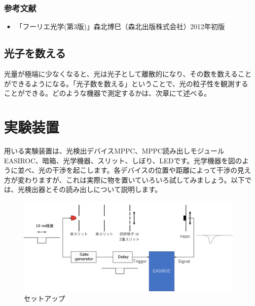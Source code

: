 \documentclass[10pt]{ujarticle}
\begin{document}
\subsubsection{参考文献}
\begin{itemize}
\item 「フーリエ光学(第3版)」森北博巳（森北出版株式会社）2012年初版
\end{itemize}
\clearpage


\subsection{光子を数える}
光量が極端に少なくなると、光は光子として離散的になり、その数を数えることができるようになる。「光子数を数える」ということで、光の粒子性を観測することができる。どのような機器で測定するかは、次章にて述べる。


\section{実験装置}
用いる実験装置は、光検出デバイスMPPC、MPPC読み出しモジュールEASIROC、暗箱、光学機器、スリット、しぼり、LEDです。光学機器を図のように並べ、光の干渉を起こします。各デバイスの位置や距離によって干渉の見え方が変わりますが、これは実際に物を置いていろいろ試してみましょう。以下では、光検出器とその読み出しについて説明します。
\begin{figure}[h]
\begin{center}
\includegraphics[width=12cm]{setup.png}
\end{center}
\caption{セットアップ}
\end{figure}
\end{document}
